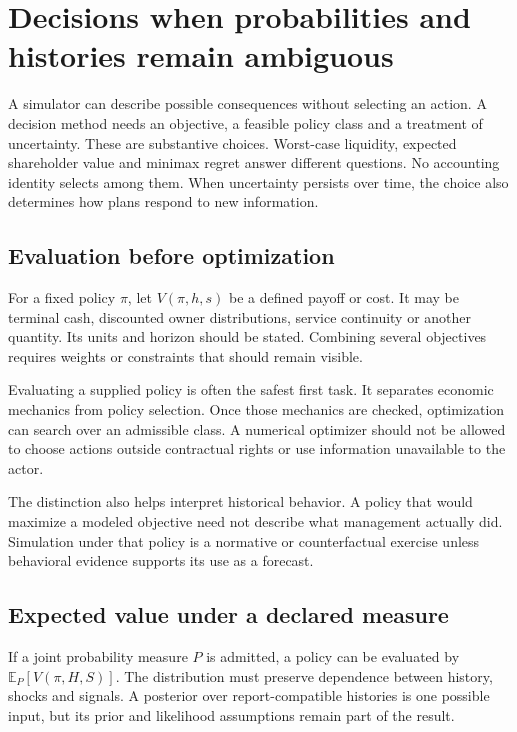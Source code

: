 \chapter[Decisions under ambiguity]{Decisions when probabilities and histories remain ambiguous}
\label{sim:decisions}

A simulator can describe possible consequences without selecting an action. A decision method needs an objective, a feasible policy class and a treatment of uncertainty. These are substantive choices. Worst-case liquidity, expected shareholder value and minimax regret answer different questions. No accounting identity selects among them. When uncertainty persists over time, the choice also determines how plans respond to new information.

\section{Evaluation before optimization}
For a fixed policy $\pi$, let $V(\pi,h,s)$ be a defined payoff or cost. It may be terminal cash, discounted owner distributions, service continuity or another quantity. Its units and horizon should be stated. Combining several objectives requires weights or constraints that should remain visible.

Evaluating a supplied policy is often the safest first task. It separates economic mechanics from policy selection. Once those mechanics are checked, optimization can search over an admissible class. A numerical optimizer should not be allowed to choose actions outside contractual rights or use information unavailable to the actor.

The distinction also helps interpret historical behavior. A policy that would maximize a modeled objective need not describe what management actually did. Simulation under that policy is a normative or counterfactual exercise unless behavioral evidence supports its use as a forecast.

\section{Expected value under a declared measure}
If a joint probability measure $P$ is admitted, a policy can be evaluated by $\mathbb E_P[V(\pi,H,S)]$. The distribution must preserve dependence between history, shocks and signals. A posterior over report-compatible histories is one possible input, but its prior and likelihood assumptions remain part of the result.

